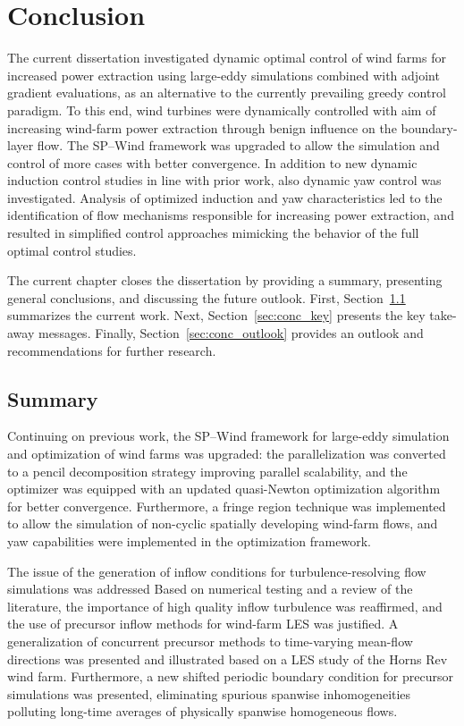 \chapter{Conclusion}\label{ch:conclusion}

The current dissertation investigated dynamic optimal control of wind farms for increased power extraction using large-eddy simulations combined with adjoint gradient evaluations, as an alternative to the currently prevailing greedy control paradigm. To this end, wind turbines were dynamically controlled with aim of increasing wind-farm power extraction through benign influence on the boundary-layer flow. The SP--Wind framework was upgraded to allow the simulation and control of more cases with better convergence. In addition to new dynamic induction control studies in line with prior work, also dynamic yaw control was investigated. Analysis of optimized induction and yaw characteristics led to the identification of flow mechanisms responsible for increasing power extraction, and resulted in simplified control approaches mimicking the behavior of the full optimal control studies.

The current chapter closes the dissertation by providing a summary, presenting general conclusions, and discussing the future outlook. First, Section~\ref{sec:conc_summ} summarizes the current work. Next, Section~\ref{sec:conc_key} presents the key take-away messages. Finally, Section~\ref{sec:conc_outlook} provides an outlook and recommendations for further research. 

\section{Summary}\label{sec:conc_summ}
Continuing on previous work, the SP--Wind framework for large-eddy simulation and optimization of wind farms was upgraded: the parallelization was converted to a pencil decomposition strategy improving parallel scalability, and the optimizer was equipped with an updated quasi-Newton optimization algorithm for better convergence. Furthermore, a fringe region technique was implemented to allow the simulation of non-cyclic spatially developing wind-farm flows, and yaw capabilities were implemented in the optimization framework.  

The issue of the generation of inflow conditions for turbulence-resolving flow simulations was addressed Based on numerical testing and a review of the literature, the importance of high quality inflow turbulence was reaffirmed, and the use of precursor inflow methods for wind-farm LES was justified. A generalization of concurrent precursor methods to time-varying mean-flow directions was presented and illustrated based on a LES study of the Horns Rev wind farm. Furthermore, a new shifted periodic boundary condition for precursor simulations was presented, eliminating spurious spanwise inhomogeneities polluting long-time averages of physically spanwise homogeneous flows. 

